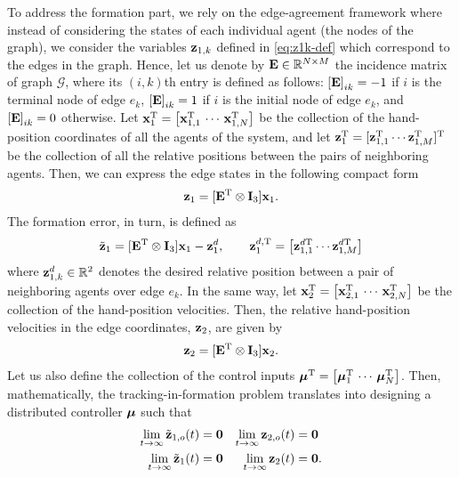 To address the formation part, we rely on the edge-agreement framework \cite{mesbahi_graph_2010} where instead of considering the states of each individual agent (the nodes of the graph), we consider the variables $\mathbf{z}_{1, k}$ defined in \eqref{eq:z1k-def} which correspond to the edges in the graph.
Hence, let us denote by $\mathbf{E} \in \mathbb{R}^{N\times M}$ the incidence matrix of graph $\mathcal{G}$, where its $(i,k)$th entry is defined as follows: $\left[\mathbf{E}\right]_{ik} = -1$ if $i$ is the terminal node of edge $e_k$, $\left[\mathbf{E}\right]_{ik} = 1$ if $i$ is the initial node of edge $e_k$, and $\left[\mathbf{E}\right]_{ik} = 0$ otherwise.
Let $\mathbf{x}_1^{\mathrm{T}} = \left[\mathbf{x}_{1, 1}^{\mathrm{T}}\,\cdots\,\mathbf{x}_{1, N}^{\mathrm{T}}\right]$ be the collection of the hand-position coordinates of all the agents of the system, and let $\mathbf{z}_1^{\mathrm{T}} = [\mathbf{z}_{1, 1}^{\mathrm{T}}\cdots \mathbf{z}_{1, M}^{\mathrm{T}}]^{\mathrm{T}}$ be the collection of all the relative positions between the pairs of neighboring agents.
Then, we can express the edge states in the following compact form
\begin{equation}\begin{aligned}\label{eq:z1-def}
\mathbf{z}_1= [\mathbf{E}^{\mathrm{T}} \otimes \mathbf{I}_3] \mathbf{x}_1.
\end{aligned}\end{equation}
The formation error, in turn, is defined as
\begin{equation}\begin{aligned}\label{eq:tildez1-def}
\tilde{\mathbf{z}}_1=[\mathbf{E}^{\mathrm{T}} \otimes \mathbf{I}_3] \mathbf{x}_1 - \mathbf{z}_1^d, \qquad
\mathbf{z}_1^{d, {\rm T}} = \left[\mathbf{z}_{1, 1}^{d{\rm T}}\cdots \mathbf{z}_{1, M}^{d{\rm T}}\right]
\end{aligned}\end{equation}
where $\mathbf{z}_{1, k}^d\in\mathbb{R}^{2}$ denotes the desired relative position between a pair of neighboring agents over edge $e_k$.
In the same way, let $\mathbf{x}_2^{\mathrm{T}}=\left[\mathbf{x}_{2, 1}^{\mathrm{T}}\,\cdots\,\mathbf{x}_{2, N}^{\mathrm{T}}\right]$ be the collection of the hand-position velocities.
Then, the relative hand-position velocities in the edge coordinates, $\mathbf{z}_2$, are given by
\begin{equation}\begin{aligned}\label{eq:z2-def}
\mathbf{z}_2=[\mathbf{E}^{\mathrm{T}} \otimes \mathbf{I}_3] \mathbf{x}_2.
\end{aligned}\end{equation}
Let us also define the collection of the control inputs $\bm{\mu}^{\mathrm{T}}=\left[\bm{\mu}_1^{\mathrm{T}}\,\cdots\,\bm{\mu}_N^{\mathrm{T}}\right]$.
Then, mathematically, the tracking-in-formation problem translates into designing a distributed controller $\bm{\mu}$ such that 
\begin{subequations}\label{n194}\begin{align}
	\lim\limits_{t \rightarrow \infty} \tilde{\mathbf{z}}_{1, o}(t) &= \mathbf{0} & \lim\limits_{t \rightarrow \infty} \mathbf{z}_{2, o}(t) &= \mathbf{0} \label{n194-a}\\
	\lim\limits_{t \rightarrow \infty} \tilde{\mathbf{z}}_1(t) &= \mathbf{0} & \lim\limits_{t \rightarrow \infty} \mathbf{z}_2(t) &= \mathbf{0}. \label{n194-b}
\end{align}\end{subequations}


